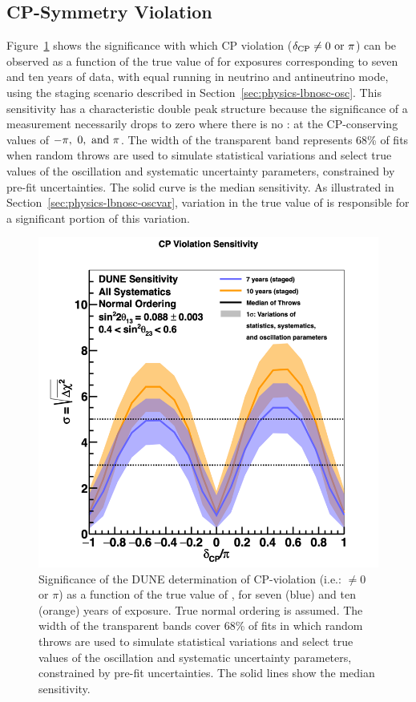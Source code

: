 \subsection{CP-Symmetry Violation}
\label{sec:physics-lbnosc-cpv}

Figure~\ref{fig:cpv_nominal} shows the significance with which CP
violation ($\mdeltacp \neq 0 \ {\rm or} \ \pi$) can be observed as a
function of the true value of \deltacp for exposures corresponding to seven and ten years of data, with equal running in neutrino and antineutrino mode, using the staging scenario described in Section~\ref{sec:physics-lbnosc-osc}.
This sensitivity has a characteristic double peak
structure because the significance of a  measurement
necessarily drops to zero where there is no : at the
CP-conserving values of $-\pi,~0,~{\rm and}~\pi$. The width of the transparent band represents 68\% of fits when random throws are used to simulate statistical variations and select true values of the oscillation and systematic uncertainty parameters, constrained by pre-fit uncertainties. The solid curve is the median sensitivity. As illustrated in Section~\ref{sec:physics-lbnosc-oscvar}, variation in the true value of  is responsible for a significant portion of this variation.

\begin{figure}[h!]
    \centering
		\includegraphics[width=0.95\linewidth]{graphics/cpv_two_exps_throws_nh_2019_v4.png}
	\caption[Significance of the DUNE determination of CP-violation as a function of \deltacp]{Significance of the DUNE determination of CP-violation (i.e.: \deltacp $\neq 0$ or $\pi$) as a function of the true value of \deltacp, for seven (blue) and ten (orange) years of exposure. True normal ordering is assumed. The width of the transparent bands cover 68\% of fits in which random throws are used to simulate statistical variations and select true values of the oscillation and systematic uncertainty parameters, constrained by pre-fit uncertainties. The solid lines show the median sensitivity.}
    \label{fig:cpv_nominal}
\end{figure}

